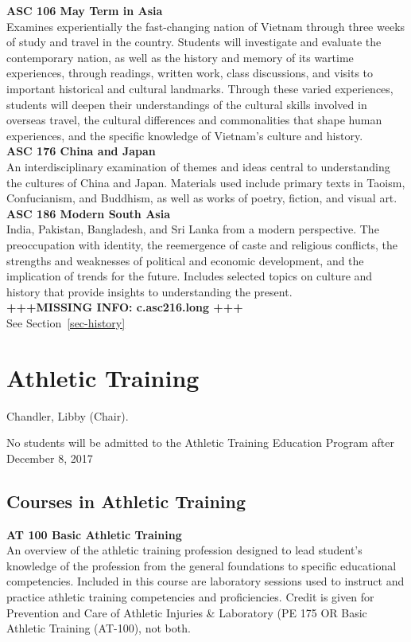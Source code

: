 \documentclass[
  letterpaper,
]{scrbook}
\begin{document}
\textbf{ASC 106 May Term in Asia}\\
Examines experientially the fast-changing nation of Vietnam through
three weeks of study and travel in the country. Students will
investigate and evaluate the contemporary nation, as well as the history
and memory of its wartime experiences, through readings, written work,
class discussions, and visits to important historical and cultural
landmarks. Through these varied experiences, students will deepen their
understandings of the cultural skills involved in overseas travel, the
cultural differences and commonalities that shape human experiences, and
the specific knowledge of Vietnam's culture and history.\\
\textbf{ASC 176 China and Japan}\\
An interdisciplinary examination of themes and ideas central to
understanding the cultures of China and Japan. Materials used include
primary texts in Taoism, Confucianism, and Buddhism, as well as works of
poetry, fiction, and visual art.\\
\textbf{ASC 186 Modern South Asia}\\
India, Pakistan, Bangladesh, and Sri Lanka from a modern perspective.
The preoccupation with identity, the reemergence of caste and religious
conflicts, the strengths and weaknesses of political and economic
development, and the implication of trends for the future. Includes
selected topics on culture and history that provide insights to
understanding the present.\\
\textbf{+++MISSING INFO: c.asc216.long +++}\\
See Section~\ref{sec-history}

\section{Athletic Training}\label{athletic-training}

Chandler, Libby (Chair).

No students will be admitted to the Athletic Training Education Program
after December 8, 2017

\subsection{Courses in Athletic
Training}\label{courses-in-athletic-training}

\textbf{AT 100 Basic Athletic Training}\\
An overview of the athletic training profession designed to lead
student's knowledge of the profession from the general foundations to
specific educational competencies. Included in this course are
laboratory sessions used to instruct and practice athletic training
competencies and proficiencies. Credit is given for Prevention and Care
of Athletic Injuries \& Laboratory (PE 175 OR Basic Athletic Training
(AT-100), not both.
\end{document}
